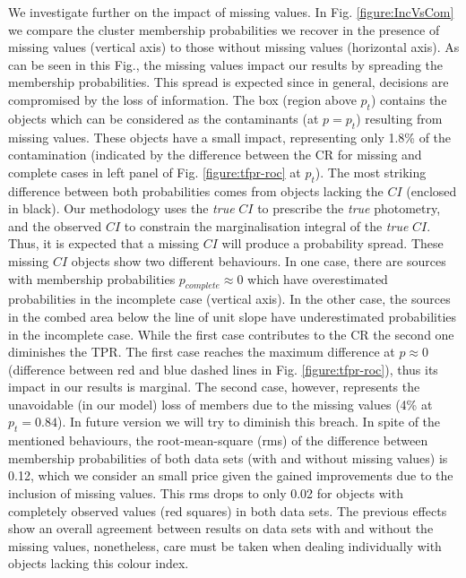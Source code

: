 We investigate further on the impact of missing values. In Fig. \ref{figure:IncVsCom} we compare the cluster membership probabilities we recover in the presence of missing values (vertical axis) to those without missing values (horizontal axis). As can be seen in this Fig., the missing values impact our results by spreading the membership probabilities. This spread is expected since in general, decisions are compromised by the loss of information. The box (region above $p_t$) contains the objects which can be considered as the contaminants (at $p=p_t$) resulting from missing values. These objects have a small impact, representing only 1.8\% of the contamination (indicated by the difference between the CR for missing and complete cases in left panel of Fig. \ref{figure:tfpr-roc} at  $p_t$). The most striking difference between both probabilities comes from objects lacking the $CI$ (enclosed in black). Our methodology uses the \emph{true} $CI$ to prescribe the \emph{true} photometry, and the observed $CI$ to constrain the marginalisation integral of the \emph{true} $CI$. Thus, it is expected that a missing $CI$ will produce a probability spread. These missing $CI$ objects show two different behaviours. In one case, there are sources with membership probabilities $p_{complete} \approx0$ which have overestimated probabilities in the incomplete case (vertical axis). In the other case, the sources in the combed area below the line of unit slope have underestimated probabilities in the incomplete case. While the first case contributes to the CR the second one diminishes the TPR. The first case reaches the maximum difference at $p \approx 0$ (difference between red and blue dashed lines in Fig. \ref{figure:tfpr-roc}), thus its impact in our results is marginal. The second case, however, represents the unavoidable (in our model) loss of members due to the missing values (4\% at $p_t=0.84$). In future version we will try to diminish this breach. In spite of the mentioned behaviours, the root-mean-square (rms) of the difference between membership probabilities of both data sets (with and without missing values) is 0.12, which we consider an small price given the gained improvements due to the inclusion of missing values. This rms drops to only 0.02 for objects with completely observed values (red squares) in both data sets. The previous effects show an overall agreement between results on data sets with and without the missing values, nonetheless, care must be taken when dealing individually with objects lacking this colour index. 

